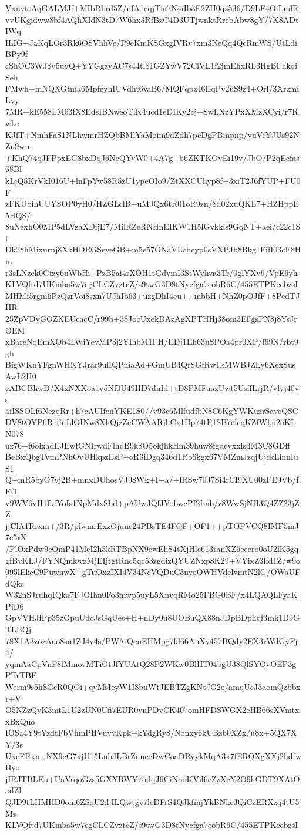 VxuvttAqGALMJf+MIbRbrd5Z/nfA1cqjTfa7N4iIb3F2ZH0qz536/D9LF4OiLmlR
vvUKgidww8bf4AQhXIdN3tD7W6hx3RfBzC4D3UTjwnktRrebAbw8gY/7K8ADtIWq
ILIG+JaKqLOr3Rk6OSVhhVe/P9eKmKSGxgIVRv7xm3NeQq4QcRmWS/UtLdiBPy9f
cShOC3WJ8v5uyQ+YYGgzyAC7s44tl81GZYwV72ClVL1f2jmEhxRL3HgBFhkqiSeh
FMwh+mNQXGtma6MpfeyhIUVdht6vaB6/MQFqpz46EqPv2uS9z4+Orl/3XrzmiLyy
7MR+kE558LM63fX8EdsIBNweoTlK4ucd1eDIKy2cj+SwLNzYPxXMzXCyi/r7Rwke
KJfT+NmhFaS1NLhwmrHZQbBMlYaMoim9dZdh7peDgPBmpnp/yuVfYJUs92NZu9wn
+KhQ74qJFPpxEG8bxDqJ6NcQYvW0+4A7g+b6ZKTKOvEi19v/JbO7P2qEcfas68Bl
kLjQ5KrVkI016U+lnFpYw58R5zU1ypeOIo9/ZtXXCUhyp8f+3xiT2J6fYUP+FU0F
zFKUbihUUYSOP0yH0/HZGLclB+uMJQx6tR01oR9zn/8d02xuQKL7+HZHppE5HQS/
8uNexhO0MP5dLVzaXDijE7/MilRZeRNHnEIKW1H5lGvkkis9GqNT+aei/c22c1St
Dk28hMixurnj8XkHDRGSeyeGB+m5e57ONaVLcbeyp0sVXPJb8Bkg1FifI03cF8Hm
r3sLNzek0Gfzy6uWbHi+PzB5ai4rXOH1tGdvmI3StWyhva3Tr/0glYXv9/VpE6yh
KLVQftd7UKmba5w7egCLCZvztcZ/s9twG3D8tNycfga7eobR6C/455ETPKcebzsI
MHMf5rgm6PzQsrVoi8sxn7UJhIb63+uzgDhI4eu++mbbH+NhZ0pOJfF+8PedTJHR
25ZpVDyGOZKEUcacC/r99b+38JocUxekDAzAgXPTHHj38om3EFgsPN8j8YsJrOEM
xBareNqEmXOb4LWiYevMP3j2YIhbM1FH/EDj1Eh63uSPOa4pr0XP/f69N/rbt9gh
BigWKnYFgnWHKYJrar9ulIQPniaAd+GmUB4QrSGfRw1kMWBJZLy6XexSusAwL2H0
cABGBhwD/X4xNXXoa1v5Nf0U49HD7dnId+tD8PMFuazUwt5UsffLrjR/vlyj40vs
afISSOLf6NezqRr+h7cAUIfenYKE1S0//v93c6MlfudfbN8C6KgYWKuzrSavcQSC
DV8tOYP6R1dnLlOINw8XhQjzZeCWAARjhCx1Hp74tP1SB7elcqKZfWku2oKLN078
uz76+f6olxadEJEwfGNIrwdFlhqB9k8O5okjhkHm39huw8fgdevxxlsdM3C8GDff
BeBxQbgTvmPNhOvUHkpzEsP+oR3iDgq346d1Rb6kgx67VMZmJzqjUjckLinnIuS1
Q+mR5byO7vj2B+mnxDUhosVJ98Wk+I+a/+lRSw70J7Si4rCI9XU00zFE9Vb/fFf1
v9WV6vII1fkfYoIs1NpMdxSbd+pAUwJQfJVobwcPI2Lnb/z8WwSjNH3Q4ZZ23jZZ
jjClA1Rrxm+/3R/plwmrExzOjuue24PBsTE4FQF+OF1++pTOPVCQ8IMP5mJ7e5rX
/PlOxPdw9cQmP41MeI2h3kRTBpNX9ewEhS4tXjHlc613ranXZ6eeero0oU2lK5gq
gfBvKLJ/FYNQmkwzMjEIjtgtRnc5qc53zgdizQYUZNxp8K29+VYixZ3lfd1Z/w9o
095lEkcC9PuwnwX+gTuOxzIXI4V34NcVQDuC3nyoOWHVdelvmtN2lG/OWaUFdQkc
W32nSJruhqIQka7FJOIhn0Fo3mwp5uyL5XnvqRMo25FBG0BF/x4LQAQLFyaKPjD6
GpVVHJfPp35zOpuUdcJsGqUes+H+nDy0u8UOBuQX88nJDpBDphqf3mk1D9GTLBQj
78X1A3zozAuo8su1ZJ4y4s/PWAiQcnEHMpg7kl66AnXv457BQdy2EX3rWdGyFj4/
yqmAaCpVnF8lMmovMTiOtJfYUAtQ28P2WKw0BlHT04bgU38QlSYQvOEP3gPTrTBE
Werm9s5h8GeR0QOi+qyMsIeyW1I8buWtJEBTZgKNtJG2e/amqUcJ3aomQzbbxr+V
O5NZzQvK3mtL1U2zUN0Ufi7EUR0vnPDvCK407omHFDSWGX2cHB66sXVmtxxBxQuo
IOSa4Y9tYzdtFbVhmPHVuvvKpk+kYdgRy8/Nonxy6kUBzb0XZx/u8x+5QX7XY/3s
UxcFRxn+NX9cG7xjU15LnbJLBrZnneeDwCoaDRyykMqA3x7fERQXgXXj2hdfwHyo
jIRJTBLEu+UaVrqoGzs5GXYRWY7odqJ9CiNooKVil6eZzXcY2O9hGDT9XAtOadZl
QJD9tLHMHD0om6ZSqU2djILQwtgv7leDFrS4QJkfmjYkBNke3QiCzERXzq4tU5Ms
KLVQftd7UKmba5w7egCLCZvztcZ/s9twG3D8tNycfga7eobR6C/455ETPKcebzsI
